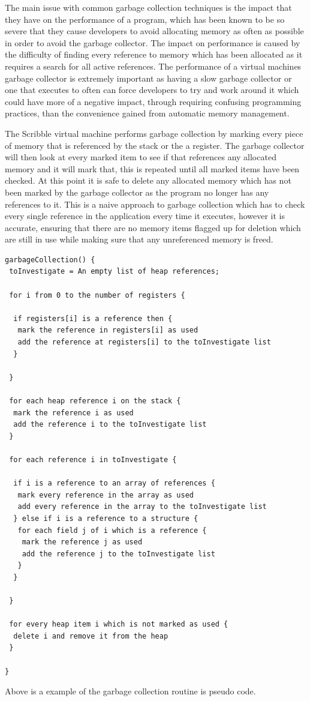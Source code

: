 \documentclass[]{final_report}
\begin{document}
The main issue with common garbage collection techniques is the impact that they have on the performance of a program, which has been known to be so severe that they cause developers to avoid allocating memory as often as possible in order to avoid the garbage collector. The impact on performance is caused by the difficulty of finding every reference to memory which has been allocated as it requires a search for all active references. The performance of a virtual machines garbage collector is extremely important as having a slow garbage collector or one that executes to often can force developers to try and work around it which could have more of a negative impact, through requiring confusing programming practices, than the convenience gained from automatic memory management.

The Scribble virtual machine performs garbage collection by marking every piece of memory that is referenced by the stack or the a register. The garbage collector will then look at every marked item to see if that references any allocated memory and it will mark that, this is repeated until all marked items have been checked. At this point it is safe to delete any allocated memory which has not been marked by the garbage collector as the program no longer has any references to it. This is a naive approach to garbage collection which has to check every single reference in the application every time it executes, however it is accurate, ensuring that there are no memory items flagged up for deletion which are still in use while making sure that any unreferenced memory is freed.

\begin{verbatim}
garbageCollection() {
 toInvestigate = An empty list of heap references;

 for i from 0 to the number of registers {

  if registers[i] is a reference then {
   mark the reference in registers[i] as used
   add the reference at registers[i] to the toInvestigate list
  }

 }
	
 for each heap reference i on the stack {
  mark the reference i as used
  add the reference i to the toInvestigate list
 }
	
 for each reference i in toInvestigate {

  if i is a reference to an array of references {
   mark every reference in the array as used
   add every reference in the array to the toInvestigate list		
  } else if i is a reference to a structure {
   for each field j of i which is a reference {
    mark the reference j as used
    add the reference j to the toInvestigate list
   }
  }
  
 }

 for every heap item i which is not marked as used {
  delete i and remove it from the heap
 }

}
\end{verbatim}
Above is a example of the garbage collection routine is pseudo code.
\end{document}
